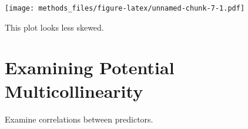 \documentclass[
]{article}
\newenvironment{Shaded}{\begin{snugshade}}{\end{snugshade}}
\newcommand{\CommentTok}[1]{\textcolor[rgb]{0.56,0.35,0.01}{\textit{#1}}}
\newcommand{\DataTypeTok}[1]{\textcolor[rgb]{0.13,0.29,0.53}{#1}}
\newcommand{\DecValTok}[1]{\textcolor[rgb]{0.00,0.00,0.81}{#1}}
\newcommand{\KeywordTok}[1]{\textcolor[rgb]{0.13,0.29,0.53}{\textbf{#1}}}
\newcommand{\NormalTok}[1]{#1}
\newcommand{\OperatorTok}[1]{\textcolor[rgb]{0.81,0.36,0.00}{\textbf{#1}}}
\newcommand{\StringTok}[1]{\textcolor[rgb]{0.31,0.60,0.02}{#1}}
\begin{document}
\texttt{[image: methods\_files/figure-latex/unnamed-chunk-7-1.pdf]}

This plot looks less skewed.

\hypertarget{examining-potential-multicollinearity}{%
\section{Examining Potential
Multicollinearity}\label{examining-potential-multicollinearity}}

Examine correlations between predictors.

\begin{Shaded}
\end{Shaded}
\end{document}
